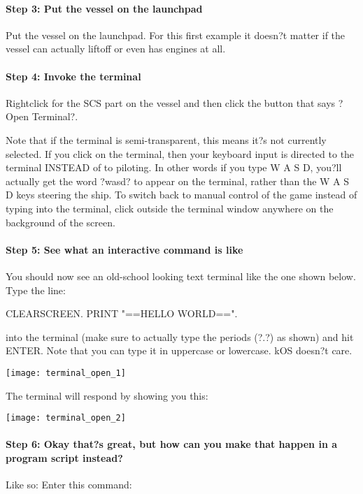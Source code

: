 \paragraph{Step 3: Put the vessel on the launchpad}
Put the vessel on the launchpad. For this first example it doesn?t matter if the vessel can actually liftoff or even has engines at all.

\paragraph{Step 4: Invoke the terminal}
Rightclick for the SCS part on the vessel and then click the button that says ?Open Terminal?.

Note that if the terminal is semi-transparent, this means it?s not currently selected. If you click on the terminal, then your keyboard input is directed to the terminal INSTEAD of to piloting. In other words if you type W A S D, you?ll actually get the word ?wasd? to appear on the terminal, rather than the W A S D keys steering the ship. To switch back to manual control of the game instead of typing into the terminal, click outside the terminal window anywhere on the background of the screen.

\paragraph{Step 5: See what an interactive command is like}
You should now see an old-school looking text terminal like the one shown below. Type the line:

\begin{framed}
CLEARSCREEN. PRINT "==HELLO WORLD==".
\end{framed}

into the terminal (make sure to actually type the periods (?.?) as shown) and hit ENTER. Note that you can type it in uppercase or lowercase. kOS doesn?t care.

\begin{center}
\texttt{[image: terminal\_open\_1]}
\end{center}

The terminal will respond by showing you this:

\begin{center}
\texttt{[image: terminal\_open\_2]}
\end{center}

\paragraph{Step 6: Okay that?s great, but how can you make that happen in a program script instead?}
Like so: Enter this command:

